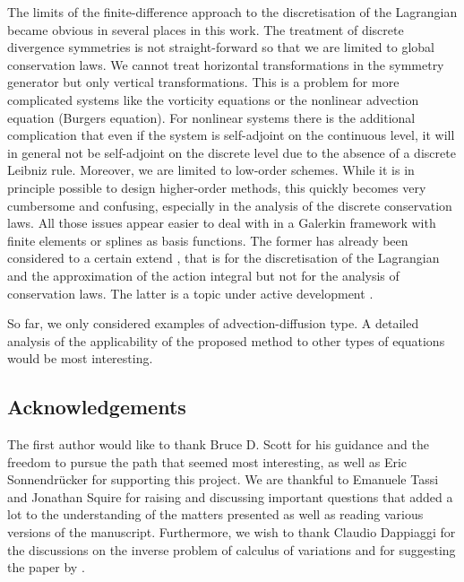 \documentclass[12pt,a4paper,reqno]{article}
\begin{document}
The limits of the finite-difference approach to the discretisation of the Lagrangian became obvious in several places in this work. The treatment of discrete divergence symmetries is not straight-forward so that we are limited to global conservation laws. We cannot treat horizontal transformations in the symmetry generator but only vertical transformations. This is a problem for more complicated systems like the vorticity equations or the nonlinear advection equation (Burgers equation).
For nonlinear systems there is the additional complication that even if the system is self-adjoint on the continuous level, it will in general not be self-adjoint on the discrete level due to the absence of a discrete Leibniz rule.
Moreover, we are limited to low-order schemes. While it is in principle possible to design higher-order methods, this quickly becomes very cumbersome and confusing, especially in the analysis of the discrete conservation laws.
All those issues appear easier to deal with in a Galerkin framework with finite elements or splines as basis functions. The former has already been considered to a certain extend \cite{Chen:2008}, that is for the discretisation of the Lagrangian and the approximation of the action integral but not for the analysis of conservation laws. The latter is a topic under active development \cite{Kraus:2015:Splines}.

So far, we only considered examples of advection-diffusion type. A detailed analysis of the applicability of the proposed method to other types of equations would be most interesting.

\subsection*{Acknowledgements}

The first author would like to thank Bruce D. Scott for his guidance and the freedom to pursue the path that seemed most interesting, as well as Eric Sonnendr\"ucker for supporting this project.
We are thankful to Emanuele Tassi and Jonathan Squire for raising and discussing important questions that added a lot to the understanding of the matters presented as well as reading various versions of the manuscript.
Furthermore, we wish to thank Claudio Dappiaggi for the discussions on the inverse problem of calculus of variations and for suggesting the paper by \citet{BampiMorro:1982}.



\end{document}
